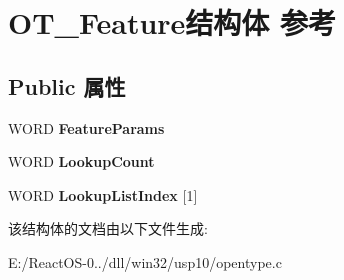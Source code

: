 \hypertarget{struct_o_t___feature}{}\section{O\+T\+\_\+\+Feature结构体 参考}
\label{struct_o_t___feature}
\subsection*{Public 属性}
\begin{DoxyCompactItemize}
\item 
\mbox{\label{struct_o_t___feature_a4c7776132ffb177a8ce7807ad96a8df7}} 
W\+O\+RD {\bfseries Feature\+Params}
\item 
\mbox{\label{struct_o_t___feature_aedbe53a63354c0c4973c1c9dd290ac6d}} 
W\+O\+RD {\bfseries Lookup\+Count}
\item 
\mbox{\label{struct_o_t___feature_a76110362cfaa49238d3ec5b77cb06ce5}} 
W\+O\+RD {\bfseries Lookup\+List\+Index} \mbox{[}1\mbox{]}
\end{DoxyCompactItemize}


该结构体的文档由以下文件生成\+:\begin{DoxyCompactItemize}
\item 
E\+:/\+React\+O\+S-\/0../dll/win32/usp10/opentype.\+c\end{DoxyCompactItemize}
